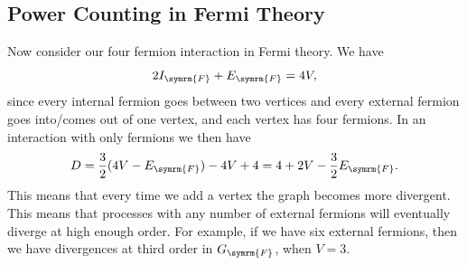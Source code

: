 \documentclass[fleqn]{NotesClass}
\newcommand{\fermiConst}{G_{\symrm{F}}}
\begin{document}
    \subsection{Power Counting in Fermi Theory}
    Now consider our four fermion interaction in Fermi theory.
    We have
    \begin{equation}
        2I_{\symrm{F}} + E_{\symrm{F}} = 4V,
    \end{equation}
    since every internal fermion goes between two vertices and every external fermion goes into/comes out of one vertex, and each vertex has four fermions.
    In an interaction with only fermions we then have
    \begin{equation}
        D = \frac{3}{2}(4V - E_{\symrm{F}}) - 4V + 4 = 4 + 2V - \frac{3}{2}E_{\symrm{F}}.
    \end{equation}
    This means that every time we add a vertex the graph becomes more divergent.
    This means that processes with any number of external fermions will eventually diverge at high enough order.
    For example, if we have six external fermions, then we have divergences at third order in \(\fermiConst\), when \(V = 3\).
    
\end{document}
